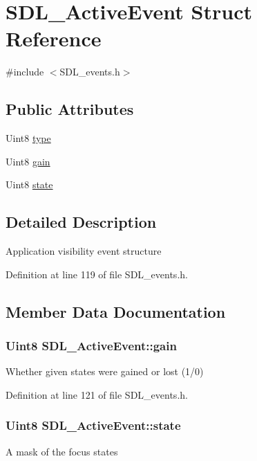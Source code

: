 \hypertarget{structSDL__ActiveEvent}{\section{S\+D\+L\+\_\+\+Active\+Event Struct Reference}
\label{structSDL__ActiveEvent}
}


{\ttfamily \#include $<$S\+D\+L\+\_\+events.\+h$>$}

\subsection*{Public Attributes}
\begin{DoxyCompactItemize}
\item 
Uint8 \hyperlink{structSDL__ActiveEvent_a4a719c0224f4c0079043432f540621c4}{type}
\item 
Uint8 \hyperlink{structSDL__ActiveEvent_a4887e4fa212696de9fa8803691dfe5c9}{gain}
\item 
Uint8 \hyperlink{structSDL__ActiveEvent_af8f060502a9c906b25a4aa9c61f745f9}{state}
\end{DoxyCompactItemize}


\subsection{Detailed Description}
Application visibility event structure 

Definition at line 119 of file S\+D\+L\+\_\+events.\+h.



\subsection{Member Data Documentation}
\hypertarget{structSDL__ActiveEvent_a4887e4fa212696de9fa8803691dfe5c9}{
\subsubsection[{gain}]{\setlength{\rightskip}{0pt plus 5cm}Uint8 S\+D\+L\+\_\+\+Active\+Event\+::gain}}\label{structSDL__ActiveEvent_a4887e4fa212696de9fa8803691dfe5c9}
Whether given states were gained or lost (1/0) 

Definition at line 121 of file S\+D\+L\+\_\+events.\+h.

\hypertarget{structSDL__ActiveEvent_af8f060502a9c906b25a4aa9c61f745f9}{
\subsubsection[{state}]{\setlength{\rightskip}{0pt plus 5cm}Uint8 S\+D\+L\+\_\+\+Active\+Event\+::state}}\label{structSDL__ActiveEvent_af8f060502a9c906b25a4aa9c61f745f9}
A mask of the focus states 

